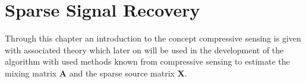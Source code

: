 \chapter{Sparse Signal Recovery}
Through this chapter an introduction to the concept compressive sensing is given with associated theory which later on will be used in the development of the algorithm with used methods known from compressive sensing to estimate the mixing matrix $\mathbf{A}$ and the sparse source matrix $\mathbf{X}$.





